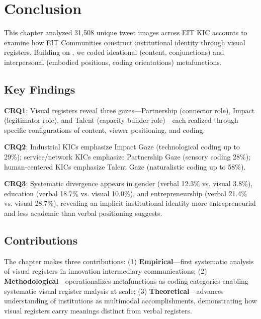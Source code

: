 \documentclass[../main.tex]{subfiles}
\begin{document}
\section{Conclusion}

This chapter analyzed 31,508 unique tweet images across EIT KIC accounts to examine how EIT Communities construct institutional identity through visual registers. Building on \textcite{jancsary2018institutions}, we coded ideational (content, conjunctions) and interpersonal (embodied positions, coding orientations) metafunctions.

\subsection{Key Findings}

\textbf{CRQ1}: Visual registers reveal three gazes---Partnership (connector role), Impact (legitimator role), and Talent (capacity builder role)---each realized through specific configurations of content, viewer positioning, and coding.

\textbf{CRQ2}: Industrial KICs emphasize Impact Gaze (technological coding up to 29\%); service/network KICs emphasize Partnership Gaze (sensory coding 28\%); human-centered KICs emphasize Talent Gaze (naturalistic coding up to 58\%).

\textbf{CRQ3}: Systematic divergence appears in gender (verbal 12.3\% vs. visual 3.8\%), education (verbal 18.7\% vs. visual 10.0\%), and entrepreneurship (verbal 21.4\% vs. visual 28.7\%), revealing an implicit institutional identity more entrepreneurial and less academic than verbal positioning suggests.

\subsection{Contributions}

The chapter makes three contributions: (1) \textbf{Empirical}---first systematic analysis of visual registers in innovation intermediary communications; (2) \textbf{Methodological}---operationalizes metafunctions as coding categories enabling systematic visual register analysis at scale; (3) \textbf{Theoretical}---advances understanding of institutions as multimodal accomplishments, demonstrating how visual registers carry meanings distinct from verbal registers.
\end{document}
